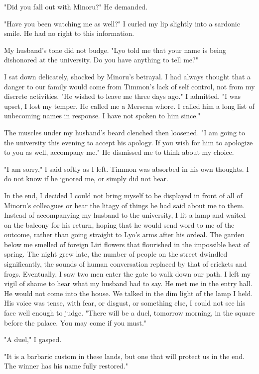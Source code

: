 \documentclass{article}
\begin{document}
"Did you fall out with Minoru?" He demanded.

"Have you been watching me as well?" I curled my lip slightly into a sardonic smile. He had no right to this information.

My husband's tone did not budge. "Lyo told me that your name is being dishonored at the university. Do you have anything to tell me?"

I sat down delicately, shocked by Minoru's betrayal. I had always thought that a danger to our family would come from Timmon's lack of self control, not from my discrete activities. "He wished to leave me three days ago." I admitted. "I was upset, I lost my temper. He called me a Mersean whore. I called him a long list of unbecoming names in response. I have not spoken to him since."

The muscles under my husband's beard clenched then loosened. "I am going to the university this evening to accept his apology. If you wish for him to apologize to you as well, accompany me." He dismissed me to think about my choice.

"I am sorry," I said softly as I left. Timmon was absorbed in his own thoughts. I do not know if he ignored me, or simply did not hear.

In the end, I decided I could not bring myself to be displayed in front of all of Minoru's colleagues or hear the litagy of things he had said about me to them. Instead of accompanying my husband to the university, I lit a lamp and waited on the balcony for his return, hoping that he would send word to me of the outcome, rather than going straight to Lyo's arms after his ordeal. The garden below me smelled of foreign Liri flowers that flourished in the impossible heat of spring. The night grew late, the number of people on the street dwindled significantly, the sounds of human conversation replaced by that of crickets and frogs. Eventually, I saw two men enter the gate to walk down our path. I left my vigil of shame to hear what my husband had to say. He met me in the entry hall. He would not come into the house. We talked in the dim light of the lamp I held. His voice was tense, with fear, or disgust, or something else, I could not see his face well enough to judge. "There will be a duel, tomorrow morning, in the square before the palace. You may come if you must."

"A duel," I gasped.

"It is a barbaric custom in these lands, but one that will protect us in the end. The winner has his name fully restored."
\end{document}
